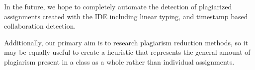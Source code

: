 \documentclass[letterpaper,10pt,conference]{IEEEtran}
\begin{document}
In the future, we hope to completely automate the detection of plagiarized assignments created with the IDE including linear typing, and timestamp based collaboration detection.

Additionally, our primary aim is to research plagiarism reduction methods, so it may be equally useful to create a heuristic that represents the general amount of plagiarism present in a class as a whole rather than individual assignments.








\end{document}
